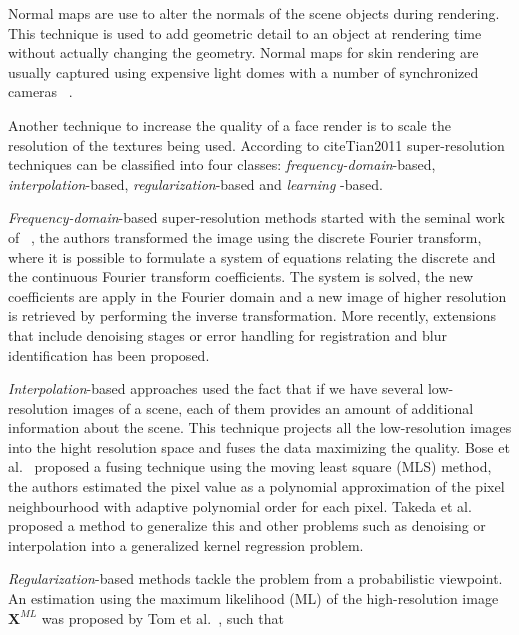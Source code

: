 \documentclass[11pt]{report}
\begin{document}
Normal maps are use to alter the normals of the scene objects during rendering.
This technique is used to add geometric detail to an object at rendering time without actually changing the geometry.
Normal maps for skin rendering are usually captured using expensive light domes with a number of synchronized cameras ~\cite{Graham2013, Weyrich2006}. 

Another technique to increase the quality of a face render is to scale the resolution of the textures being used.
According to cite{Tian2011} super-resolution techniques can be classified into four classes: \textit{frequency-domain}-based,	\textit{interpolation}-based, \textit{regularization}-based and \textit{learning }-based.

\textit{Frequency-domain}-based super-resolution methods started with the seminal work of ~\cite{Tsai:1984}, the authors transformed the image using the discrete Fourier transform, where it is possible to formulate a system of equations relating the discrete and the continuous Fourier transform coefficients.
The system is solved, the new coefficients are apply in the Fourier domain and a new image of higher resolution is retrieved by performing the inverse transformation.
More recently, extensions that include denoising stages \cite{Chappalli:2005} or error handling for registration and blur identification \cite{Ji:2009} has been proposed.

\textit{Interpolation}-based approaches used the fact that if we have several low-resolution images of a scene, each of them provides an amount of additional information about the scene.
This technique projects all the low-resolution images into the hight resolution space and fuses the data maximizing the quality.
Bose et al.~\cite{Bose:2006} proposed a fusing technique using the moving least square (MLS) method, the authors estimated the pixel value as a polynomial approximation of the pixel neighbourhood with adaptive polynomial order for each pixel.
Takeda et al.~\cite{Takeda:2007} proposed a method to generalize this and other problems such as denoising or interpolation into a generalized kernel regression problem.

\textit{Regularization}-based methods tackle the problem from a probabilistic viewpoint.
An estimation using the maximum likelihood (ML) of the high-resolution image $\mathbf{X}^{ML}$ was proposed by Tom et al.~\cite{Tom:1995}, such that
\end{document}
